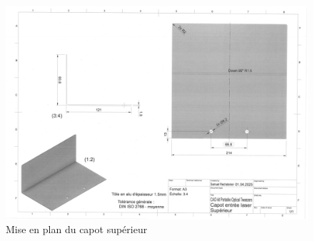 \begin{figure}[H]
    \centering
    \includegraphics[angle=90,width=\textwidth]{assets/figures/Annexes/Mises_en_plan/mise_en_plan_superieur.png}
    \caption{Mise en plan du capot supérieur}
    \label{mise_en_plan_capot_superieur}
\end{figure}